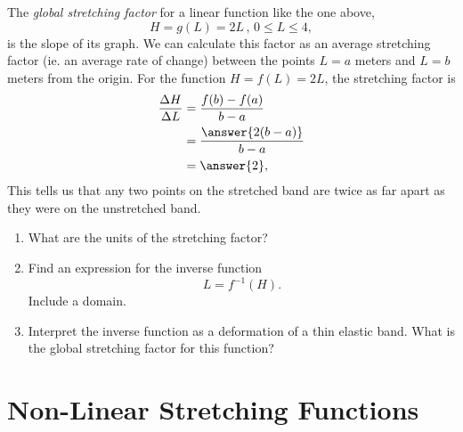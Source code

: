 \documentclass{ximera}
\begin{document}
The \emph{global stretching factor} for a linear function like the one above, %
\[
      H = g(L) = 2L \, , \, 0\leq L \leq 4 ,
\]
is the slope of its graph. We can calculate this factor as an average stretching factor (ie. an average rate of change) between the points $L=a$  meters and $L=b$ meters from the origin. For the function $H=f(L) = 2L$, the stretching factor is
\begin{align*}
  \frac{\Delta H}{\Delta L} &= \frac{f(b) - f(a)}{b-a} \\
                                       &= \frac{\answer{2(b-a)}}{b-a} \\
                                       &= \answer{2},
\end{align*}
This tells us that any two points on the stretched band are twice as far apart as they were on the unstretched band.

\begin{question}  \label{Q:LDJJNMDesd}
\begin{enumerate}
\item What are the units of the stretching factor?
\begin{freeResponse}
\end{freeResponse}

\item Find an expression for the inverse function
\[
      L = f^{-1}(H).
\]
Include a domain. 

\item Interpret the inverse function as a deformation of a thin elastic band. What is the global stretching factor for this function?
\begin{freeResponse}
\end{freeResponse}
\end{enumerate}
\end{question}



\section{Non-Linear Stretching Functions}
\end{document}
